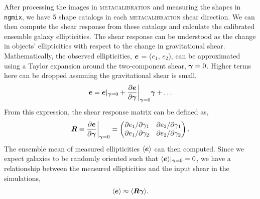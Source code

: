 \documentclass[fleqn,usenatbib]{mnras}
\begin{document}
After processing the images in \textsc{metacalibration} and measuring the shapes in \texttt{ngmix}, we have 5 shape catalogs in each \textsc{metacalibration} shear direction. We can then compute the shear response from these catalogs and calculate the calibrated ensemble galaxy ellipticities. The shear response can be understood as the change in objects' ellipticities with respect to the change in gravitational shear. Mathematically, the observed ellipticities, $\vb*{e}$ = ($e_{1}$, $e_{2}$), can be approximated using a Taylor expansion around the two-component shear, $\vb*{\gamma}=0$. Higher terms here can be dropped assuming the gravitational shear is small. 
\begin{equation}
    \vb*{e} = \vb*{e}\rvert_{\vb*{\gamma}=0} + \frac{\partial \vb*{e}}{\partial \vb*{\gamma}}\bigg\rvert_{\vb*{\gamma}=0}\vb*{\gamma} + \ldots
\end{equation}
From this expression, the shear response matrix can be defined as, 
\begin{equation}
    \vb*{R} \equiv \frac{\partial \vb*{e}}{\partial \vb*{\gamma}}\bigg\rvert_{\vb*{\gamma}=0} = 
    \begin{pmatrix}
        \partial e_{1}/\partial \gamma_{1} & \partial e_{2}/\partial \gamma_{1} \\ 
        \partial e_{1}/\partial \gamma_{2} & \partial e_{2}/\partial \gamma_{2}
    \end{pmatrix}. 
\end{equation}
The ensemble mean of measured ellipticities $\langle\vb*{e}\rangle$ can then computed. Since we expect galaxies to be randomly oriented such that $\langle\vb*{e}\rangle\rvert_{\vb*{\gamma}=0}=0$, we have a relationship between the measured ellipticities and the input shear in the simulations, 
\begin{equation}
    \langle\vb*{e}\rangle \approx \langle \vb*{R}\vb*{\gamma} \rangle. 
\end{equation} 
\end{document}
